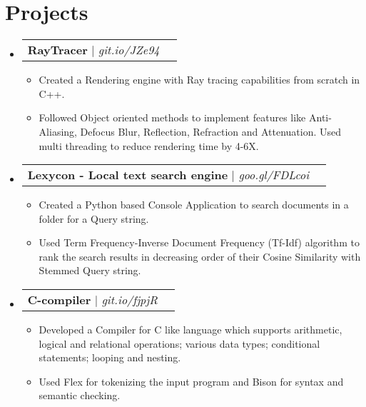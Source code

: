 \documentclass[letterpaper,11pt]{article}
\makeatletter
\newcommand{\resumeItem}[1]{
  \item\small{
    {#1 \vspace{-2pt}}
  }
}
\newcommand{\resumeProjectHeading}[2]{
    \item
    \begin{tabular*}{1.001\textwidth}{l@{\extracolsep{\fill}}r}
      \small#1 & \textbf{\small #2}\\
    \end{tabular*}\vspace{-7pt}
}
\newcommand{\resumeSubHeadingListStart}{\begin{itemize}[leftmargin=0.0in, label={}]}
\newcommand{\resumeSubHeadingListEnd}{\end{itemize}}
\newcommand{\resumeItemListStart}{\begin{itemize}}
\newcommand{\resumeItemListEnd}{\end{itemize}\vspace{-5pt}}
\makeatother
\begin{document}
\section{Projects}
    \vspace{-5pt}
    \resumeSubHeadingListStart
          \resumeProjectHeading
          {\textbf{RayTracer} $|$ \emph{git.io/JZe94}}{}
          \resumeItemListStart
            \resumeItem{Created a Rendering engine with Ray tracing capabilities from scratch in C++.}
            \resumeItem{Followed Object oriented methods to implement features like Anti-Aliasing, Defocus Blur, Reflection, Refraction and Attenuation. Used multi threading to reduce rendering time by 4-6X.}
          \resumeItemListEnd
          \vspace{-13pt}
      \resumeProjectHeading
          {\textbf{Lexycon - Local text search engine} $|$ \emph{goo.gl/FDLcoi}}{}
          \resumeItemListStart
            \resumeItem{Created a Python based Console Application to search documents in a folder for a Query string.}
            \resumeItem{Used Term Frequency-Inverse Document Frequency (Tf-Idf) algorithm to rank the search results in decreasing
order of their Cosine Similarity with Stemmed Query string.}
          \resumeItemListEnd
          \vspace{-13pt}
      \resumeProjectHeading
          {\textbf{C-compiler} $|$ \emph{git.io/fjpjR}}{}
          \resumeItemListStart
            \resumeItem{Developed a Compiler for C like language which supports arithmetic, logical and relational operations; various
data types; conditional statements; looping and nesting.}
            \resumeItem{Used Flex for tokenizing the input program and Bison for syntax and semantic checking.}
          \resumeItemListEnd
    \resumeSubHeadingListEnd
\vspace{-15pt}
\end{document}
